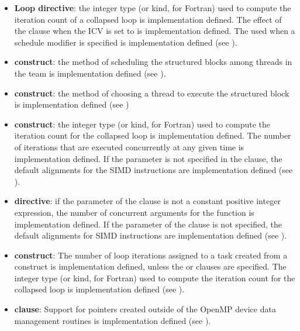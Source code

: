 \begin{itemize}
\item \textbf{Loop directive}: the integer type (or kind, for Fortran) used to compute the iteration
count of a collapsed loop is implementation defined. The effect of the
 clause when the  ICV is set to  is
implementation defined. The  used when a 
schedule modifier is specified is implementation defined (see ).

\item {} \textbf{construct}: the method of scheduling the structured blocks among threads
in the team is implementation defined (see ).

\item {} \textbf{construct}: the method of choosing a thread to execute the structured block
is implementation defined (see )

\item {} \textbf{construct}: the integer type (or kind, for
  Fortran) used to compute the iteration count for the collapsed loop
  is implementation defined. The number of iterations that are
  executed concurrently at any given time is implementation
  defined. If the  parameter is not specified in the
   clause, the default alignments for the SIMD
  instructions are implementation defined (see ).

\item {} \textbf{directive}: if the parameter of the
   clause is not a constant positive integer expression,
  the number of concurrent arguments for the function is
  implementation defined. If the  parameter of the
   clause is not specified, the default alignments for
  SIMD instructions are implementation defined (see
  ).

\item {} \textbf{construct}: The number of loop
  iterations assigned to a task created from a 
  construct is implementation defined, unless the  or
   clauses are specified. The integer type (or kind,
  for Fortran) used to compute the iteration count for the collapsed
  loop is implementation defined (see ).

\item {} \textbf{clause}:
  Support for pointers created outside of the OpenMP device data management
  routines is implementation defined (see ).


\end{itemize}
